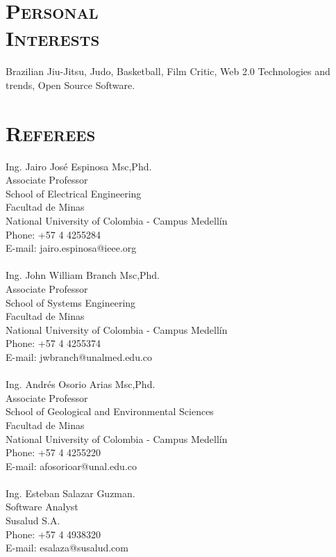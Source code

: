 \begin{resume}
\section{\textsc{Personal\\ Interests}}
\employer{}
\title{}
\location{} 
\dates{}
Brazilian Jiu-Jitsu, Judo, Basketball, Film Critic, Web 2.0 Technologies and trends, Open Source Software.

\section{\textsc{Referees}}

Ing. Jairo Jos\'{e} Espinosa Msc,Phd.\\
Associate Professor \\
School of Electrical Engineering \\
Facultad de Minas \\
National University of Colombia - Campus Medell\'{i}n\\
Phone: +57 4 4255284 \\
E-mail: jairo.espinosa@ieee.org\\
\\  
Ing. John William Branch Msc,Phd.\\
Associate Professor \\
School of Systems Engineering \\
Facultad de Minas \\
National University of Colombia - Campus Medell\'{i}n\\
Phone: +57 4 4255374 \\
E-mail: jwbranch@unalmed.edu.co\\
\\  
Ing. Andr\'{e}s Osorio Arias Msc,Phd.\\
Associate Professor \\
School of Geological and Environmental Sciences \\
Facultad de Minas \\
National University of Colombia - Campus Medell\'{i}n\\
Phone: +57 4 4255220 \\
E-mail: afosorioar@unal.edu.co\\
\\  
Ing. Esteban Salazar Guzman.\\
Software Analyst \\
Susalud S.A. \\
Phone: +57 4 4938320 \\
E-mail: esalaza@susalud.com\\
\\  


\end{resume}

